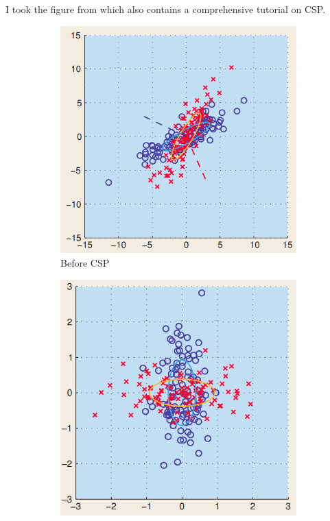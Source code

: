 
I took the figure from \cite{blankertz2007optimizing} which also contains a comprehensive tutorial on CSP.

\begin{figure}
    \centering
    \begin{subfigure}{.5\textwidth}
        \centering
        \includegraphics[width=1.\linewidth]{images_report/sensor/before_csp_filtering.png}
        \caption{Before CSP}
        \label{fig:before_csp}
    \end{subfigure}%
    \begin{subfigure}{.5\textwidth}
        \centering
        \includegraphics[width=1.\linewidth]{images_report/sensor/after_csp_filtering.png}

\end{subfigure}
\end{figure}
